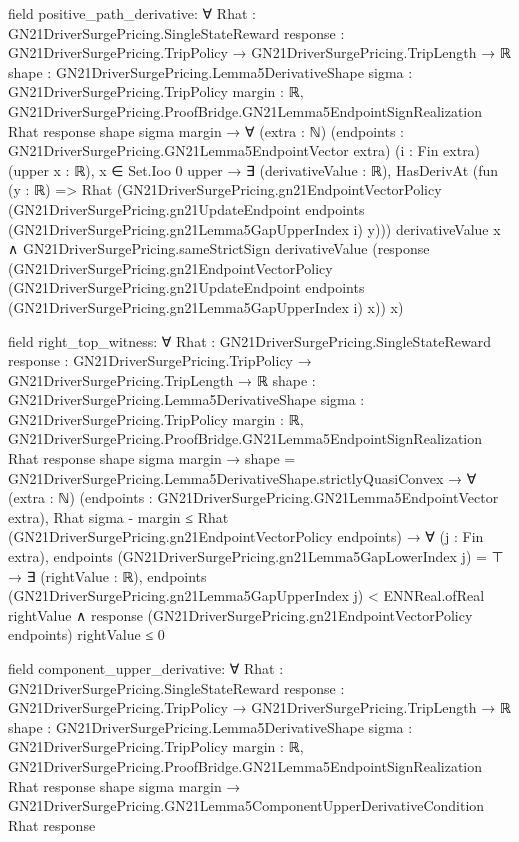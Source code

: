 \documentclass[10pt]{article}
\begin{document}
\begin{ReviewVerbatim}
field positive_path_derivative:
∀ {Rhat : GN21DriverSurgePricing.SingleStateReward}
  {response : GN21DriverSurgePricing.TripPolicy → GN21DriverSurgePricing.TripLength → ℝ}
  {shape : GN21DriverSurgePricing.Lemma5DerivativeShape} {sigma : GN21DriverSurgePricing.TripPolicy} {margin : ℝ},
  GN21DriverSurgePricing.ProofBridge.GN21Lemma5EndpointSignRealization Rhat response shape sigma margin →
    ∀ (extra : ℕ) (endpoints : GN21DriverSurgePricing.GN21Lemma5EndpointVector extra) (i : Fin extra) (upper x : ℝ),
      x ∈ Set.Ioo 0 upper →
        ∃ (derivativeValue : ℝ),
          HasDerivAt
              (fun (y : ℝ) =>
                Rhat
                  (GN21DriverSurgePricing.gn21EndpointVectorPolicy
                    (GN21DriverSurgePricing.gn21UpdateEndpoint endpoints
                      (GN21DriverSurgePricing.gn21Lemma5GapUpperIndex i) y)))
              derivativeValue x ∧
            GN21DriverSurgePricing.sameStrictSign derivativeValue
              (response
                (GN21DriverSurgePricing.gn21EndpointVectorPolicy
                  (GN21DriverSurgePricing.gn21UpdateEndpoint endpoints
                    (GN21DriverSurgePricing.gn21Lemma5GapUpperIndex i) x))
                x)

field right_top_witness:
∀ {Rhat : GN21DriverSurgePricing.SingleStateReward}
  {response : GN21DriverSurgePricing.TripPolicy → GN21DriverSurgePricing.TripLength → ℝ}
  {shape : GN21DriverSurgePricing.Lemma5DerivativeShape} {sigma : GN21DriverSurgePricing.TripPolicy} {margin : ℝ},
  GN21DriverSurgePricing.ProofBridge.GN21Lemma5EndpointSignRealization Rhat response shape sigma margin →
    shape = GN21DriverSurgePricing.Lemma5DerivativeShape.strictlyQuasiConvex →
      ∀ (extra : ℕ) (endpoints : GN21DriverSurgePricing.GN21Lemma5EndpointVector extra),
        Rhat sigma - margin ≤ Rhat (GN21DriverSurgePricing.gn21EndpointVectorPolicy endpoints) →
          ∀ (j : Fin extra),
            endpoints (GN21DriverSurgePricing.gn21Lemma5GapLowerIndex j) = ⊤ →
              ∃ (rightValue : ℝ),
                endpoints (GN21DriverSurgePricing.gn21Lemma5GapUpperIndex j) < ENNReal.ofReal rightValue ∧
                  response (GN21DriverSurgePricing.gn21EndpointVectorPolicy endpoints) rightValue ≤ 0

field component_upper_derivative:
∀ {Rhat : GN21DriverSurgePricing.SingleStateReward}
  {response : GN21DriverSurgePricing.TripPolicy → GN21DriverSurgePricing.TripLength → ℝ}
  {shape : GN21DriverSurgePricing.Lemma5DerivativeShape} {sigma : GN21DriverSurgePricing.TripPolicy} {margin : ℝ},
  GN21DriverSurgePricing.ProofBridge.GN21Lemma5EndpointSignRealization Rhat response shape sigma margin →
    GN21DriverSurgePricing.GN21Lemma5ComponentUpperDerivativeCondition Rhat response


\end{ReviewVerbatim}
\end{document}
